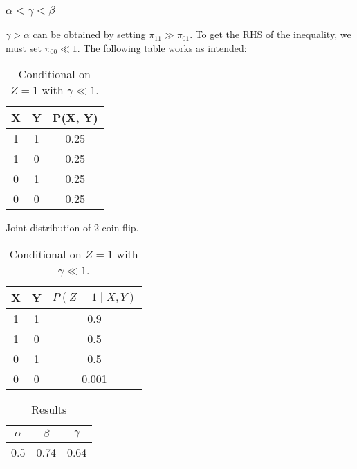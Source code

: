 \documentclass{article}
\numberwithin{equation}{section}
\begin{document}
\subsubsection{$\alpha < \gamma < \beta$}
$\gamma > \alpha$ can be obtained by setting $\pi_{11} \gg \pi_{01}$. To get 
the RHS of the inequality, we must set $\pi_{00}\ll 1$.
The following table works as intended:
\begin{table}[H]
\begin{minipage}{.45\textwidth}
        \centering
        
        \begin{tabular}{|c|c|c|}
                \hline
                X & Y & P(X, Y) \\  \hline
                1 & 1 & 0.25 \\\hline 
                1 & 0 & 0.25 \\\hline 
                0 & 1 & 0.25 \\\hline 
                0 & 0 & 0.25 \\\hline
        \end{tabular}
        \caption{Joint distribution of 2 coin flip.}
\end{minipage}
\begin{minipage}{.45\textwidth}
        \centering
        \begin{tabular}{|c|c|c|}
                \hline
                X & Y & $P(Z = 1 \mid X, Y)$ \\\hline
                1 & 1 & 0.9 \\\hline
                1 & 0 & 0.5 \\\hline
                0 & 1 & 0.5 \\\hline
                0 & 0 & 0.001 \\\hline
        \end{tabular}
        \caption{Conditional on $Z = 1$ with $\gamma \ll 1$.}
\end{minipage}
        \label{tab:Joint}
\end{table}

\begin{table}[H]
        \centering
        \begin{tabular}{|c|c|c|}
                \hline 
                $\alpha$ & $\beta$ & $\gamma$ \\ \hline 
                0.5 & 0.74 & 0.64 \\\hline
        \end{tabular}
        \caption{Results}
        \label{tab:Res2}
\end{table}
\end{document}
